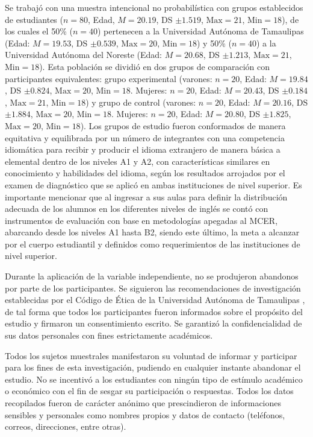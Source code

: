 \documentclass[spanish]{textolivre}
\begin{document}
Se trabajó con una muestra intencional no probabilística con grupos establecidos de estudiantes ($n=80$, Edad, $M=20.19$, DS $\pm 1.519$, $\text{Max}=21$, $\text{Min}=18$), de los cuales el 50\% ($n=40$) pertenecen a la Universidad Autónoma de Tamaulipas (Edad: $M=19.53$, DS $\pm 0.539$, $\text{Max}=20$, $\text{Min}=18$) y 50\% ($n=40$) a la Universidad Autónoma del Noreste (Edad: $M=20.68$, DS $\pm 1.213$, $\text{Max}=21$, $\text{Min}=18$). Esta población se dividió en dos grupos de comparación con participantes equivalentes: grupo experimental (varones: $n=20$, Edad: $M=19.84$, DS $\pm 0.824$, $\text{Max}=20$, $\text{Min}=18$. Mujeres: $n=20$, Edad: $M=20.43$, DS $\pm 0.184$, $\text{Max}=21$, $\text{Min}=18$) y grupo de control (varones: $n=20$, Edad: $M=20.16$, DS $\pm 1.884$, $\text{Max}=20$, $\text{Min}=18$. Mujeres: $n=20$, Edad: $M=20.80$, DS $\pm 1.825$, $\text{Max}=20$, $\text{Min}=18$). Los grupos de estudio fueron conformados de manera equitativa y equilibrada por un número de integrantes con una competencia idiomática para recibir y producir el idioma extranjero de manera básica a elemental dentro de los niveles A1 y A2, con características similares en conocimiento y habilidades del idioma, según los resultados arrojados por el examen de diagnóstico que se aplicó en ambas instituciones de nivel superior. Es importante mencionar que al ingresar a sus aulas para definir la distribución adecuada de los alumnos en los diferentes niveles de inglés se contó con instrumentos de evaluación con base en metodologías apegadas al MCER, abarcando desde los niveles A1 hasta B2, siendo este último, la meta a alcanzar por el cuerpo estudiantil y definidos como requerimientos de las instituciones de nivel superior.

Durante la aplicación de la variable independiente, no se produjeron abandonos por parte de los participantes. Se siguieron las recomendaciones de investigación establecidas por el Código de Ética de la Universidad Autónoma de Tamaulipas \cite{universida2018}, de tal forma que todos los participantes fueron informados sobre el propósito del estudio y firmaron un consentimiento escrito. Se garantizó la confidencialidad de sus datos personales con fines estrictamente académicos.

Todos los sujetos muestrales manifestaron su voluntad de informar y participar para los fines de esta investigación, pudiendo en cualquier instante abandonar el estudio. No se incentivó a los estudiantes con ningún tipo de estímulo académico o económico con el fin de sesgar su participación o respuestas. Todos los datos recopilados fueron de carácter anónimo que prescindieron de informaciones sensibles y personales como nombres propios y datos de contacto (teléfonos, correos, direcciones, entre otras).
\end{document}
